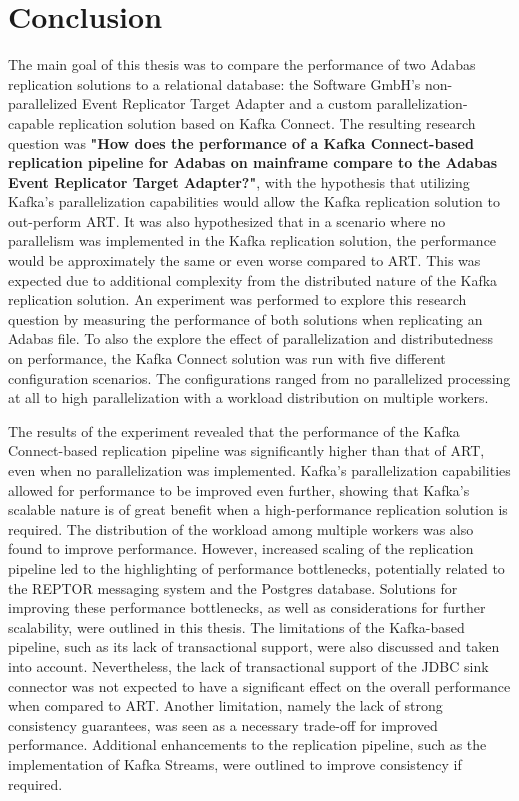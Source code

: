 \chapter{Conclusion}
\label{ch08:conclusion}
The main goal of this thesis was to compare the performance of two Adabas replication solutions to a relational database: the Software GmbH's non-parallelized Event Replicator Target Adapter and a custom parallelization-capable replication solution based on Kafka Connect. The resulting research question was \textbf{"How does the performance of a Kafka Connect-based replication pipeline for Adabas on mainframe compare to the Adabas Event Replicator Target Adapter?"}, with the hypothesis that utilizing Kafka's parallelization capabilities would allow the Kafka replication solution to out-perform \ac{ART}. It was also hypothesized that in a scenario where no parallelism was implemented in the Kafka replication solution, the performance would be approximately the same or even worse compared to \ac{ART}. This was expected due to additional complexity from the distributed nature of the Kafka replication solution. An experiment was performed to explore this research question by measuring the performance of both solutions when replicating an Adabas file. To also the explore the effect of parallelization and distributedness on performance, the Kafka Connect solution was run with five different configuration scenarios. The configurations ranged from no parallelized processing at all to high parallelization with a workload distribution on multiple workers.

The results of the experiment revealed that the performance of the Kafka Connect-based replication pipeline was significantly higher than that of \ac{ART}, even when no parallelization was implemented. Kafka's parallelization capabilities allowed for performance to be improved even further, showing that Kafka's scalable nature is of great benefit when a high-performance replication solution is required. The distribution of the workload among multiple workers was also found to improve performance. However, increased scaling of the replication pipeline led to the highlighting of performance bottlenecks, potentially related to the \ac{REPTOR} messaging system and the Postgres database. Solutions for improving these performance bottlenecks, as well as considerations for further scalability, were outlined in this thesis. The limitations of the Kafka-based pipeline, such as its lack of transactional support, were also discussed and taken into account. Nevertheless, the lack of transactional support of the \ac{JDBC} sink connector was not expected to have a significant effect on the overall performance when compared to \ac{ART}. Another limitation, namely the lack of strong consistency guarantees, was seen as a necessary trade-off for improved performance. Additional enhancements to the replication pipeline, such as the implementation of Kafka Streams, were outlined to improve consistency if required.

